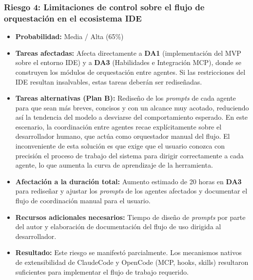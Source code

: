 \documentclass[11pt, letterpaper]{article}
\begin{document}
\subsubsection{Riesgo 4: Limitaciones de control sobre el flujo de orquestación en el ecosistema IDE}
\label{sec:riesgo4}
\begin{itemize}
    \item \textbf{Probabilidad:} Media / Alta (65\%)
    \item \textbf{Tareas afectadas:} Afecta directamente a \textbf{DA1} (implementación del MVP sobre el entorno IDE) y a \textbf{DA3} (Habilidades e Integración MCP), donde se construyen los módulos de orquestación entre agentes. Si las restricciones del IDE resultan insalvables, estas tareas deberán ser rediseñadas.
    \item \textbf{Tareas alternativas (Plan B):} Rediseño de los \textit{prompts} de cada agente para que sean más breves, concisos y con un alcance muy acotado, reduciendo así la tendencia del modelo a desviarse del comportamiento esperado. En este escenario, la coordinación entre agentes recae explícitamente sobre el desarrollador humano, que actúa como orquestador manual del flujo. El inconveniente de esta solución es que exige que el usuario conozca con precisión el proceso de trabajo del sistema para dirigir correctamente a cada agente, lo que aumenta la curva de aprendizaje de la herramienta.
    \item \textbf{Afectación a la duración total:} Aumento estimado de 20 horas en \textbf{DA3} para rediseñar y ajustar los \textit{prompts} de los agentes afectados y documentar el flujo de coordinación manual para el usuario.
    \item \textbf{Recursos adicionales necesarios:} Tiempo de diseño de \textit{prompts} por parte del autor y elaboración de documentación del flujo de uso dirigida al desarrollador.
    \item \textbf{Resultado:} Este riesgo se manifestó parcialmente. Los mecanismos nativos de extensibilidad de ClaudeCode y OpenCode (MCP, hooks, skills) resultaron suficientes para implementar el flujo de trabajo requerido.
\end{itemize}
\end{document}
